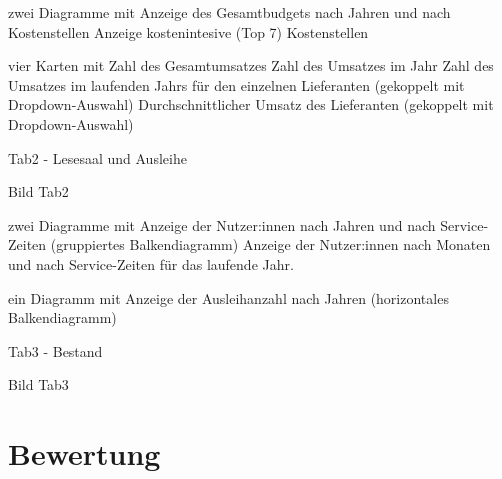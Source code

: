    zwei Diagramme mit
        Anzeige des Gesamtbudgets nach Jahren und nach Kostenstellen 
        Anzeige kostenintesive (Top 7) Kostenstellen
        
    
    vier Karten mit
        Zahl des Gesamtumsatzes
        Zahl des Umsatzes im Jahr
        Zahl des Umsatzes im laufenden Jahrs für den einzelnen Lieferanten (gekoppelt mit Dropdown-Auswahl)
        Durchschnittlicher Umsatz des Lieferanten (gekoppelt mit Dropdown-Auswahl)
    
    
    
    
    
    Tab2 - Lesesaal und Ausleihe
    
    Bild Tab2
    
    zwei Diagramme mit
        Anzeige der Nutzer:innen nach Jahren und nach Service-Zeiten (gruppiertes Balkendiagramm)
        Anzeige der Nutzer:innen nach Monaten und nach Service-Zeiten für das laufende Jahr.
        
     ein Diagramm mit
        Anzeige der Ausleihanzahl nach Jahren (horizontales Balkendiagramm)
    
    Tab3 - Bestand
    
    Bild Tab3

    
     



\section{Bewertung}
